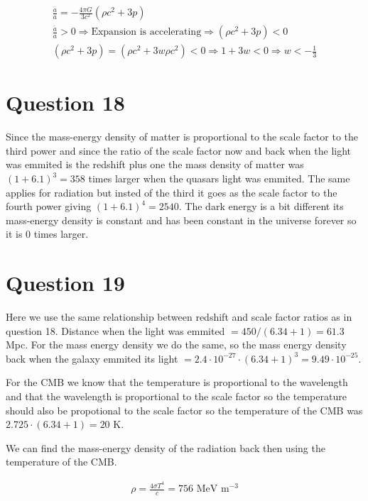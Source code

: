 \documentclass[a4paper]{article}
\begin{document}
\begin{align}
    \frac{\ddot{a}}{a} = -\frac{4\pi G}{3c^2}(\rho c^2 + 3p) \\
    \frac{\ddot{a}}{a} > 0 \Rightarrow \text{Expansion is accelerating} \Rightarrow (\rho c^2 + 3p) < 0 \\ 
    (\rho c^2 + 3p) = (\rho c^2 + 3w \rho c^2) < 0 \Rightarrow 1 + 3w < 0 \Rightarrow w < -\frac{1}{3}
\end{align}

\section*{Question 18}

Since the mass-energy density of matter is proportional to the scale factor to the third power and since the ratio of the scale factor now and back when the light was emmited is the redshift plus one the mass density of matter was $(1+6.1)^3 = 358$ times larger when the quasars light was emmited. The same applies for radiation but insted of the third it goes as the scale factor to the fourth power giving $(1+6.1)^4 = 2540$. The dark energy is a bit different its mass-energy density is constant and has been constant in the universe forever so it is 0 times larger. 

\section*{Question 19}

Here we use the same relationship between redshift and scale factor ratios as in question 18. Distance when the light was emmited $= 450 / (6.34+1) = 61.3$ Mpc. For the mass energy density we do the same, so the mass energy density back when the galaxy emmited its light $= 2.4 \cdot 10^{-27} \cdot (6.34+1)^3 = 9.49 \cdot 10^{-25}$.

For the CMB we know that the temperature is proportional to the wavelength and that the wavelength is proportional to the scale factor so the temperature should also be propotional to the scale factor so the temperature of the CMB was $2.725 \cdot (6.34+1) = 20$ K.

We can find the mass-energy density of the radiation back then using the temperature of the CMB.

\begin{align}
    \rho = \frac{4 \sigma T^4}{c} = 756 \text{ MeV} \text{ m}^{-3}
\end{align}
 
\pagebreak
\end{document}
